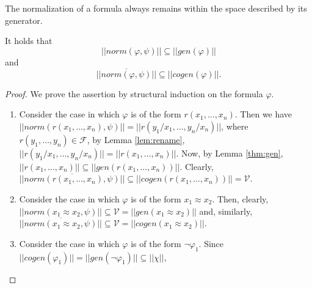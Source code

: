 \documentclass{lmcs}
\def\F{\mathcal F}
\def\V{\mathcal V}
\def\norm{norm}
\def\gen{gen}
\def\cogen{cogen}
\begin{document}
The normalization of a formula always remains within the space described by its generator.
\begin{lem}\label{lem:norm1}
It holds that 
$$||\norm(\varphi,\psi)||\subseteq||\gen(\varphi)||$$ 
and 
$$\overline{||\norm(\varphi,\psi)||}\subseteq||\cogen(\varphi)||.$$ 
\end{lem}
\begin{proof}
We prove the assertion by structural induction on the formula $\varphi$.
\begin{enumerate}
\item Consider the case in which $\varphi$ is of the form $r(x_1,\ldots,x_n)$.  Then we have\\ $||\norm(r(x_1,\ldots,x_n),\psi)||=||r(y_1/x_1,\ldots,y_n/x_n)||$, where $r(y_1,\ldots,y_n)\in\F$, by Lemma \ref{lem:rename}, $||r(y_1/x_1,\ldots,y_n/x_n)||=||r(x_1,\ldots,x_n)||$. Now, by Lemma \ref{thm:gen}, $||r(x_1,\ldots,x_n)||\subseteq||\gen(r(x_1,\ldots,x_n))||$. Clearly, $\overline{||\norm(r(x_1,\ldots,x_n),\psi)||}\subseteq||\cogen(r(x_1,\ldots,x_n))||=\V$.
\item Consider the case in which $\varphi$ is of the form $x_1\approx x_2$. Then, clearly,  $||\norm(x_1\approx x_2,\psi)||\subseteq\V=||\gen(x_1\approx x_2)||$ and, similarly, $\overline{||\norm(x_1\approx x_2,\psi)||}\subseteq\V=||\cogen(x_1\approx x_2)||$.

\item Consider the case in which $\varphi$ is of the form $\neg\varphi_1$. Since $||\cogen(\varphi_1)||=||\gen(\neg\varphi_1)||\subseteq||\chi||$, 


\end{enumerate}
\end{proof}
\end{document}
